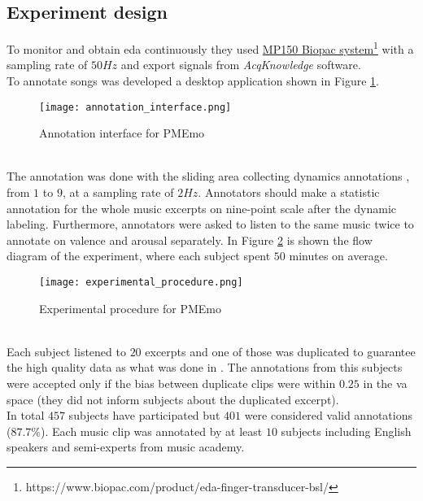 \subsection{Experiment design}
To monitor and obtain \gls{eda} continuously they used \href{https://www.biopac.com/product/eda-finger-transducer-bsl/}{MP150 Biopac system}\footnote{https://www.biopac.com/product/eda-finger-transducer-bsl/} with a sampling rate of $50Hz$ and export signals from \textit{AcqKnowledge} software.
\\
To annotate songs was developed a desktop application shown in Figure \ref{fig:annotation_interface}. 
\begin{figure}[h]
    \centering
    \texttt{[image: annotation\_interface.png]} 
	\caption{Annotation interface for PMEmo}
    \label{fig:annotation_interface}
\end{figure}
\\
The annotation was done with the sliding area collecting dynamics annotations , from $1$ to $9$, at a sampling rate of $2Hz$. Annotators should make a statistic annotation for the whole music excerpts on nine-point scale after the dynamic labeling. Furthermore, annotators were asked to listen to the same music twice to annotate on valence and arousal separately.
\newpage
In Figure \ref{fig:experimental_procedure} is shown the flow diagram of the experiment, where each subject spent $50$ minutes on average.
\begin{figure}[h]
    \centering
    \texttt{[image: experimental\_procedure.png]} 
	\caption{Experimental procedure for PMEmo}
    \label{fig:experimental_procedure}
\end{figure}
\\
Each subject listened to $20$ excerpts and one of those was duplicated to guarantee the high quality data as what was done in \cite{chen2015amg1608}. The annotations from this subjects were accepted only if the bias between duplicate clips were within $0.25$ in the \gls{va} space (they did not inform subjects about the duplicated excerpt).
\\
In total $457$ subjects have participated but $401$ were considered valid annotations ($87.7\%$). Each music clip was annotated by at least $10$ subjects including English speakers and semi-experts from music academy.

